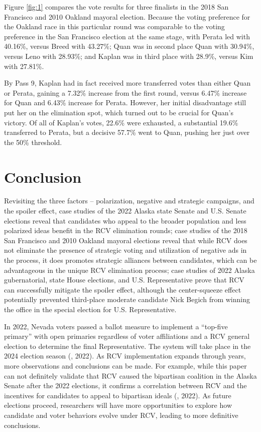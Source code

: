 \documentclass[12pt, a4paper, twoside]{article}
\begin{document}
Figure \ref{fig:1} compares the vote results for three finalists in the 2018 San Francisco and 2010 Oakland mayoral election. Because the voting preference for the Oakland race in this particular round was comparable to the voting preference in the San Francisco election at the same stage, with Perata led with 40.16\%, versus Breed with 43.27\%; Quan was in second place Quan with 30.94\%, versus Leno with 28.93\%; and Kaplan was in third place with 28.9\%, versus Kim with 27.81\%. 

By Pass 9, Kaplan had in fact received more transferred votes than either Quan or Perata, gaining a 7.32\% increase from the first round, versus 6.47\% increase for Quan and 6.43\% increase for Perata. However, her initial disadvantage still put her on the elimination spot, which turned out to be crucial for Quan’s victory. Of all of Kaplan’s votes, 22.6\% were exhausted, a substantial 19.6\% transferred to Perata, but a decisive 57.7\% went to Quan, pushing her just over the 50\% threshold. 

\section{Conclusion}

Revisiting the three factors – polarization, negative and strategic campaigns, and the spoiler effect, case studies of the 2022 Alaska state Senate and U.S. Senate elections reveal that candidates who appeal to the broader population and less polarized ideas benefit in the RCV elimination rounds; case studies of the 2018 San Francisco and 2010 Oakland mayoral elections reveal that while RCV does not eliminate the presence of strategic voting and utilization of negative ads in the process, it does promotes strategic alliances between candidates, which can be advantageous in the unique RCV elimination process; case studies of 2022 Alaska gubernatorial, state House elections, and U.S. Representative prove that RCV can successfully mitigate the spoiler effect, although the center-squeeze effect potentially prevented third-place moderate candidate Nick Begich from winning the office in the special election for U.S. Representative. 

In 2022, Nevada voters passed a ballot measure to implement a “top-five primary” with open primaries regardless of voter affiliations and a RCV general election to determine the final Representative. The system will take place in the 2024 election season (\cite{clyde2022}, 2022). As RCV implementation expands through years, more observations and conclusions can be made. For example, while this paper can not definitely validate that RCV caused the bipartisan coalition in the Alaska Senate after the 2022 elections, it confirms a correlation between RCV and the incentives for candidates to appeal to bipartisan ideals (\cite{rosen2022}, 2022). As future elections proceed, researchers will have more opportunities to explore how candidate and voter behaviors evolve under RCV, leading to more definitive conclusions. 
\end{document}
